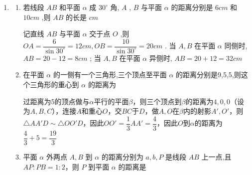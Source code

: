 \begin{enumerate}
\begin{enumerate}
\begin{jieda}
          \end{jieda}
          \item 正方体 ${ABCD} - {A}_{1}{B}_{1}{C}_{1}{D}_{1}$ 的棱长为 $a$ ,则顶点 $B$ 到截面 ${AC}{B}_{1}$ 的距离是
          \begin{jieda}
              截面 ${AC}{B}_{1}$、截面 ${A_1C_1}D$三等分体对角线$BD_1$，且$BD_1$垂直于两截面.
          \end{jieda}
          \item $P$ 为 $\bigtriangleup  {ABC}$ 所在平面 $\alpha$ 外一点,且 ${PA} = {PB} = {PC} = {10},{AB} = 6,{BC} = 8,{CA} = {10}$ ,则点 $P$ 到平面 ${ABC}$ 的距离为, ${PA},{PB},{PC}$ 与面 ${ABC}$ 所成的三个角依次为
          \begin{jieda}
              $\angle{B} = \ang{90}$，$P$在$\alpha$内的射影是$AC$中点.
          \end{jieda}
      \end{enumerate}
      \item \begin{enumerate}
          \item 若线段 ${AB}$ 和平面 $\alpha$ 成 ${30}^{ \circ  }$ 角, $A$ , $B$ 与平面 $\alpha$ 的距离分别是 $6{{cm}}$ 和 ${10}{{cm}}$ ,则 ${AB}$ 的长是 ${{cm}}$
          \begin{jieda}
              记直线 ${AB}$ 与平面 $\alpha$ 交于点 $O$ ,则 ${OA} = \dfrac{6}{\sin {30}^{ \circ  }} = {12}{{cm}},{OB} = \dfrac{10}{\sin {30}^{ \circ  }} = {20}{{cm}}$ . 当 $A,B$ 在平面 $\alpha$ 同侧时, ${AB} = {20} - {12} = 8{{cm}}$ ; 当 $A,B$ 在平面 $\alpha$ 异侧时, ${AB} = {20} + {12} = {32}{{cm}}$
          \end{jieda}
          \item 在平面 $\alpha$ 的一侧有一个三角形,三个顶点至平面 $\alpha$ 的距离分别是9,5,5,则这个三角形的重心到 $\alpha$ 的距离为
          \begin{jieda}
              过距离为5的顶点做与$\alpha$平行的平面$\beta$，则三个顶点到$\beta$的距离为$4,0,0$（设为$A,B,C$），连接$A$和重心$O$，交$BC$于$D$，做$A,O$在$\beta$内的射影$A', O'$，则$\bigtriangleup{AA'D} \sim \bigtriangleup{OO'D}$，因此$OO' = \dfrac{1}{3}AA' = \dfrac{4}{3}$，因此$O$到$\alpha$的距离为$\dfrac{4}{3}+5 = \dfrac{19}{3}$
          \end{jieda}
          \item 平面 $\alpha$ 外两点 $A,B$ 到 $\alpha$ 的距离分别为 $a,b,P$ 是线段 ${AB}$ 上一点,且 ${AP} : {PB} = 1: 2$，则 $P$ 到平面 $\alpha$ 的距离是

\end{enumerate}
\end{enumerate}

